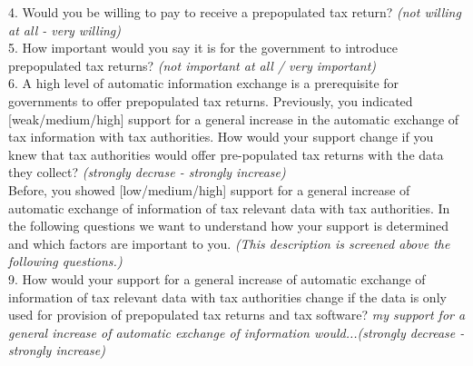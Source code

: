\documentclass[11pt]{article}
\begin{document}
4. Would you be willing to pay to receive a prepopulated tax return? \textit{(not willing at all - very willing)} \\[0.5em]
5. How important would you say it is for the government to introduce prepopulated tax returns? \textit{(not important at all / very important)} \\[0.5em]
6. A high level of automatic information exchange is a prerequisite for governments to offer prepopulated tax returns. Previously, you indicated [weak/medium/high] support for a general increase in the automatic exchange of tax information with tax authorities. How would your support change if you knew that tax authorities would offer pre-populated tax returns with the data they collect? \textit{(strongly decrase - strongly increase)}\\[1em]
Before, you showed [low/medium/high] support for a general increase of automatic exchange of information of tax relevant data with tax authorities. In the following questions we want to understand how your support is determined and which factors are important to you. \textit{(This description is screened above the following questions.)} \\[0.5em]
9. How would your support for a general increase of automatic exchange of information of tax relevant data with tax authorities change if the data is only used for provision of prepopulated tax returns and tax software? \textit{my support for a general increase of automatic exchange of information would...(strongly decrease - strongly increase)}
\end{document}
